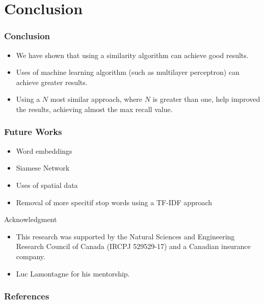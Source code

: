 \documentclass{beamer}
\begin{document}
	\section{Conclusion}
	
	\begin{frame}\frametitle{Conclusion}
		\begin{itemize}
			\item We have shown that using a similarity algorithm can achieve good results.
			\item Uses of machine learning algorithm (such as multilayer perceptron) can achieve greater results.
			\item Using a $N$ most similar approach, where $N$ is greater than one, help improved the results, achieving almost the max recall value.
		\end{itemize}
	\end{frame}

	\begin{frame}\frametitle{Future Works}
		\begin{itemize}
			\item Word embeddings \cite{word2vec, glove, wu2017starspace, name2vec, singh2019embedding}
			\item Siamese Network \cite{godbole2018siamese, 8967103}
			\item Uses of spatial data \cite{10.1145/1183471.1183486}
			\item Removal of more specitif stop words using a TF-IDF approach \cite{tfidf}
		\end{itemize}
	\end{frame}

	\begin{frame}{Acknowledgment}
		\begin{itemize}
			\item This research was supported by the Natural Sciences and Engineering Research Council of Canada (IRCPJ 529529-17) and a Canadian insurance company. 
			\item Luc Lamontagne for his mentorship.
		\end{itemize}
	\end{frame}
	
	\begin{frame}[t, allowframebreaks]
		\frametitle{References}
		
		
	\end{frame}
	
\end{document}
